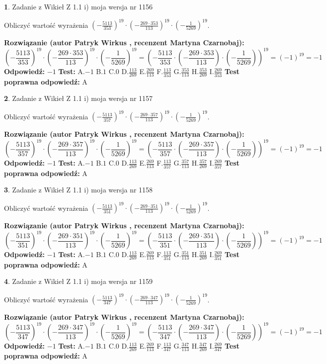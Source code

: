 \documentclass[12pt, a4paper]{article}
\theoremstyle{definition} %
\newtheorem{zad}{}
\newcommand{\zadStart}[1]{\begin{zad}#1\newline}
\newcommand{\zadStop}{\end{zad}}
\newcommand{\rozwStart}[2]{\noindent \textbf{Rozwiązanie (autor #1 , recenzent #2): }\newline}
\newcommand{\rozwStop}{\newline}
\newcommand{\odpStart}{\noindent \textbf{Odpowiedź:}\newline}
\newcommand{\odpStop}{\newline}
\newcommand{\testStart}{\noindent \textbf{Test:}\newline}
\newcommand{\testStop}{\newline}
\newcommand{\kluczStart}{\noindent \textbf{Test poprawna odpowiedź:}\newline}
\newcommand{\kluczStop}{\newline}
\begin{document}
\zadStart{Zadanie z Wikieł Z 1.1 i) moja wersja nr 1156}

Obliczyć wartość wyrażenia $(-\frac{5113}{353})^{19} \cdot (-\frac{269 \cdot 353}{113})^{19} \cdot (-\frac{1}{5269})^{19}$.
\zadStop
\rozwStart{Patryk Wirkus}{Martyna Czarnobaj}
$$(-\frac{5113}{353})^{19} \cdot (-\frac{269 \cdot 353}{113})^{19} \cdot (-\frac{1}{5269})^{19} = (-\frac{5113}{353} \cdot (-\frac{269 \cdot 353}{113}) \cdot (-\frac{1}{5269}))^{19} = (-1)^{19} = -1$$
\rozwStop
\odpStart
$-1$
\odpStop
\testStart
A.$-1$ B.$1$ C.$0$ D.$\frac{113}{269}$ E.$\frac{269}{113}$
F.$\frac{113}{353}$ G.$\frac{353}{113}$
H.$\frac{353}{269}$
I.$\frac{269}{353}$
\testStop
\kluczStart
A
\kluczStop



\zadStart{Zadanie z Wikieł Z 1.1 i) moja wersja nr 1157}

Obliczyć wartość wyrażenia $(-\frac{5113}{357})^{19} \cdot (-\frac{269 \cdot 357}{113})^{19} \cdot (-\frac{1}{5269})^{19}$.
\zadStop
\rozwStart{Patryk Wirkus}{Martyna Czarnobaj}
$$(-\frac{5113}{357})^{19} \cdot (-\frac{269 \cdot 357}{113})^{19} \cdot (-\frac{1}{5269})^{19} = (-\frac{5113}{357} \cdot (-\frac{269 \cdot 357}{113}) \cdot (-\frac{1}{5269}))^{19} = (-1)^{19} = -1$$
\rozwStop
\odpStart
$-1$
\odpStop
\testStart
A.$-1$ B.$1$ C.$0$ D.$\frac{113}{269}$ E.$\frac{269}{113}$
F.$\frac{113}{357}$ G.$\frac{357}{113}$
H.$\frac{357}{269}$
I.$\frac{269}{357}$
\testStop
\kluczStart
A
\kluczStop



\zadStart{Zadanie z Wikieł Z 1.1 i) moja wersja nr 1158}

Obliczyć wartość wyrażenia $(-\frac{5113}{351})^{19} \cdot (-\frac{269 \cdot 351}{113})^{19} \cdot (-\frac{1}{5269})^{19}$.
\zadStop
\rozwStart{Patryk Wirkus}{Martyna Czarnobaj}
$$(-\frac{5113}{351})^{19} \cdot (-\frac{269 \cdot 351}{113})^{19} \cdot (-\frac{1}{5269})^{19} = (-\frac{5113}{351} \cdot (-\frac{269 \cdot 351}{113}) \cdot (-\frac{1}{5269}))^{19} = (-1)^{19} = -1$$
\rozwStop
\odpStart
$-1$
\odpStop
\testStart
A.$-1$ B.$1$ C.$0$ D.$\frac{113}{269}$ E.$\frac{269}{113}$
F.$\frac{113}{351}$ G.$\frac{351}{113}$
H.$\frac{351}{269}$
I.$\frac{269}{351}$
\testStop
\kluczStart
A
\kluczStop



\zadStart{Zadanie z Wikieł Z 1.1 i) moja wersja nr 1159}

Obliczyć wartość wyrażenia $(-\frac{5113}{347})^{19} \cdot (-\frac{269 \cdot 347}{113})^{19} \cdot (-\frac{1}{5269})^{19}$.
\zadStop
\rozwStart{Patryk Wirkus}{Martyna Czarnobaj}
$$(-\frac{5113}{347})^{19} \cdot (-\frac{269 \cdot 347}{113})^{19} \cdot (-\frac{1}{5269})^{19} = (-\frac{5113}{347} \cdot (-\frac{269 \cdot 347}{113}) \cdot (-\frac{1}{5269}))^{19} = (-1)^{19} = -1$$
\rozwStop
\odpStart
$-1$
\odpStop
\testStart
A.$-1$ B.$1$ C.$0$ D.$\frac{113}{269}$ E.$\frac{269}{113}$
F.$\frac{113}{347}$ G.$\frac{347}{113}$
H.$\frac{347}{269}$
I.$\frac{269}{347}$
\testStop
\kluczStart
A
\kluczStop
\end{document}
